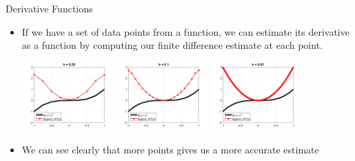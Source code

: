 {}\documentclass[letterpaper,
compress,
xcolor=x11names,
]{beamer}
\begin{document}
\begin{frame}{Derivative Functions}
	\footnotesize
	\begin{itemize}
		\item If we have a set of data points from a function, we can estimate its derivative as a function by computing our finite difference estimate at each point.
		\begin{center}
			\includegraphics[width=3.5cm]{derivative_h0.25.png} \hspace{0.25cm}
			\includegraphics[width=3.5cm]{derivative_h0.1.png} \hspace{0.25cm}
			\includegraphics[width=3.5cm]{derivative_h0.01.png} 
		\end{center}
		\item We can see clearly that more points gives us a more accurate estimate 
	\end{itemize}
	
\end{frame}

\end{document}
